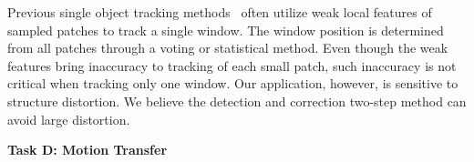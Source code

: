 {%
Previous single object tracking methods~\cite{Martinez:2008,Artner:2011,Cehovin:2013,Cai:2014} {often utilize weak local features of sampled patches to track a single window. The window position is determined from all patches through a voting or statistical method. Even though the weak features bring inaccuracy to tracking of each small patch, such inaccuracy is not critical when tracking only one window. Our application, however, is sensitive to structure distortion. We believe the detection and correction two-step method can avoid large distortion.} 




\textbf{Task D: Motion Transfer}

}

